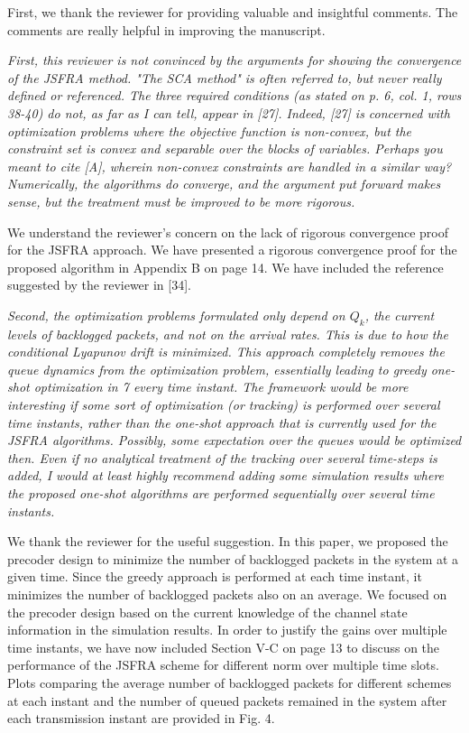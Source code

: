 
First, we thank the reviewer for providing valuable and insightful comments. The comments are really helpful in improving the manuscript.

\begin{itemize}

 \textit{First, this reviewer is not convinced by the arguments for showing the convergence of the JSFRA method. "The SCA method" is often referred to, but never really defined or referenced. The three required conditions (as stated on p. 6, col. 1, rows 38-40) do not, as far as I can tell, appear in [27]. Indeed, [27] is concerned with optimization problems where the objective function is non-convex, but the constraint set is convex and separable over the blocks of variables. Perhaps you meant to cite [A], wherein non-convex constraints are handled in a similar way? Numerically, the algorithms do converge, and the argument put forward makes sense, but the treatment must be improved to be more rigorous.}

\resp We understand the reviewer's concern on the lack of rigorous convergence proof for the JSFRA approach. We have presented a rigorous convergence proof for the proposed algorithm in Appendix B on page 14. We have included the reference suggested by the reviewer in [34]. 

 \textit{Second, the optimization problems formulated only depend on $Q_k$, the current levels of backlogged packets, and not on the arrival rates. This is due to how the conditional Lyapunov drift is minimized. This approach completely removes the queue dynamics from the optimization problem, essentially leading to greedy one-shot optimization in 7
every time instant. The framework would be more interesting if some sort of optimization (or tracking) is performed over several time instants, rather than the one-shot approach that is currently used for the JSFRA algorithms. Possibly, some expectation over the queues would be optimized then. Even if no analytical treatment of the tracking over several time-steps is added, I would at least highly recommend adding some simulation results where the proposed one-shot algorithms are performed sequentially over several time instants.}

\resp We thank the reviewer for the useful suggestion. In this paper, we proposed the precoder design to minimize the number of backlogged packets in the system at a given time. Since the greedy approach is performed at each time instant, it minimizes the number of backlogged packets also on an average. We focused on the precoder design based on the current knowledge of the channel state information in the simulation results. In order to justify the gains over multiple time instants, we have now included Section V-C on page 13 to discuss on the performance of the JSFRA scheme for different  norm over multiple time slots. Plots comparing the average number of backlogged packets for different schemes at each instant and the number of queued packets remained in the system after each transmission instant are provided in Fig. 4.


\end{itemize}
